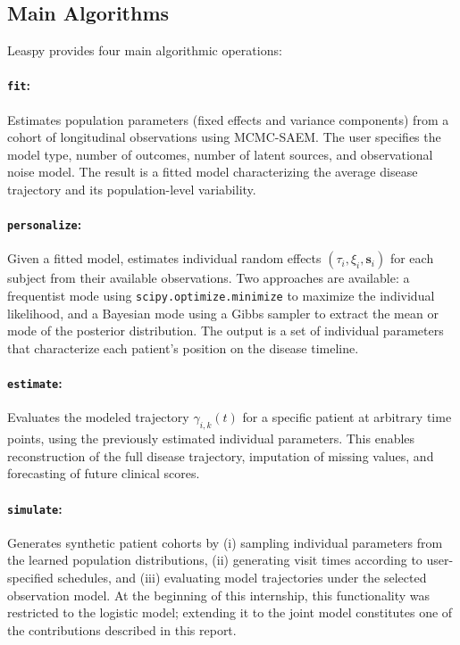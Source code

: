 \documentclass{rapportCS}
\begin{document}
\subsection{Main Algorithms}

Leaspy provides four main algorithmic operations:

\paragraph{\texttt{fit}:} Estimates population parameters (fixed effects and variance components) from a cohort of longitudinal observations using MCMC-SAEM. The user specifies the model type, number of outcomes, number of latent sources, and observational noise model. The result is a fitted model characterizing the average disease trajectory and its population-level variability.

\paragraph{\texttt{personalize}:} Given a fitted model, estimates individual random effects $(\tau_i, \xi_i, \mathbf{s}_i)$ for each subject from their available observations. Two approaches are available: a frequentist mode using \texttt{scipy.optimize.minimize} to maximize the individual likelihood, and a Bayesian mode using a Gibbs sampler to extract the mean or mode of the posterior distribution. The output is a set of individual parameters that characterize each patient's position on the disease timeline.

\paragraph{\texttt{estimate}:} Evaluates the modeled trajectory $\gamma_{i,k}(t)$ for a specific patient at arbitrary time points, using the previously estimated individual parameters. This enables reconstruction of the full disease trajectory, imputation of missing values, and forecasting of future clinical scores.

\paragraph{\texttt{simulate}:} Generates synthetic patient cohorts by (i) sampling individual parameters from the learned population distributions, (ii) generating visit times according to user-specified schedules, and (iii) evaluating model trajectories under the selected observation model. At the beginning of this internship, this functionality was restricted to the logistic model; extending it to the joint model constitutes one of the contributions described in this report.
\end{document}
